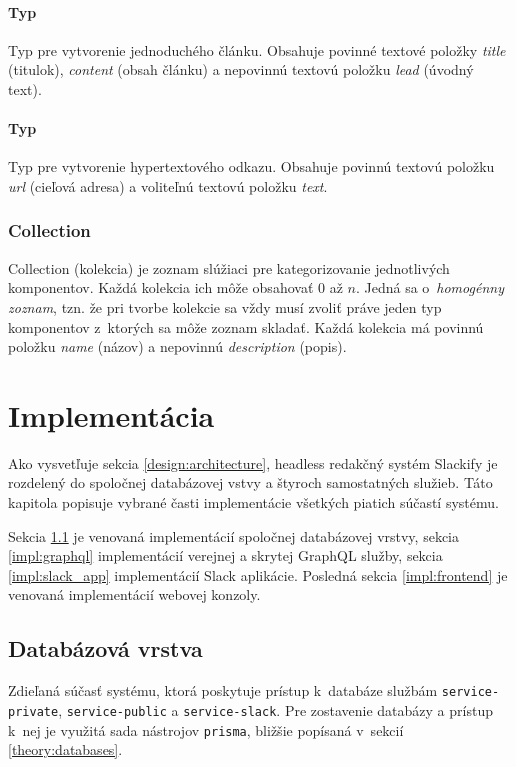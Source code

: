 \subsubsection{Typ }
Typ pre vytvorenie jednoduchého článku. Obsahuje povinné textové položky \emph{title} (titulok), \emph{content} (obsah článku) a nepovinnú textovú položku \emph{lead} (úvodný text).

\subsubsection{Typ }
Typ pre vytvorenie hypertextového odkazu. Obsahuje povinnú textovú položku \emph{url} (cieľová adresa) a voliteľnú textovú položku \emph{text}.

\subsection{Collection}
\label{design:collection}
Collection (kolekcia) je zoznam slúžiaci pre kategorizovanie jednotlivých komponentov. Každá kolekcia ich môže obsahovať 0 až $n$. Jedná sa o~\emph{homogénny zoznam}, tzn. že pri tvorbe kolekcie sa vždy musí zvoliť práve jeden typ komponentov z~ktorých sa môže zoznam skladať. Každá kolekcia má povinnú položku \emph{name} (názov) a nepovinnú \emph{description} (popis).

\chapter{Implementácia}
Ako vysvetľuje sekcia \ref{design:architecture}, headless redakčný systém Slackify je rozdelený do spoločnej databázovej vstvy a štyroch samostatných služieb. Táto kapitola popisuje vybrané časti implementácie všetkých piatich súčastí systému.

Sekcia \ref{impl:database} je venovaná implementácií spoločnej databázovej vrstvy, sekcia \ref{impl:graphql} implementácií verejnej a skrytej GraphQL služby, sekcia \ref{impl:slack_app} implementácií Slack aplikácie. Posledná sekcia \ref{impl:frontend} je venovaná implementácií webovej konzoly.

\section{Databázová vrstva}
\label{impl:database}
Zdieľaná súčasť systému, ktorá poskytuje prístup k~databáze službám \texttt{service-private}, \texttt{service-public} a \texttt{service-slack}. Pre zostavenie databázy a prístup k~nej je využitá sada nástrojov \texttt{prisma}, bližšie popísaná v~sekcií \ref{theory:databases}.

